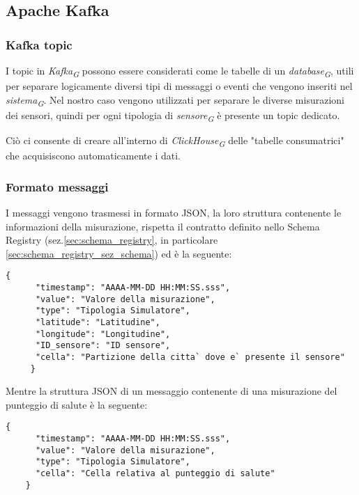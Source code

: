\subsection{Apache Kafka}
\subsubsection{Kafka topic}
I topic in \textit{Kafka}\textsubscript{\textit{G}} possono essere considerati come le tabelle di un \textit{database}\textsubscript{\textit{G}}, utili per separare logicamente diversi tipi di messaggi o eventi che vengono inseriti nel \textit{sistema}\textsubscript{\textit{G}}. Nel nostro caso vengono utilizzati per separare le diverse misurazioni dei sensori, quindi per ogni tipologia di \textit{sensore}\textsubscript{\textit{G}} è presente un topic dedicato.

Ciò ci consente di creare all'interno di \textit{ClickHouse}\textsubscript{\textit{G}} delle "tabelle consumatrici" che acquisiscono automaticamente i dati.

\subsubsection{Formato messaggi} \label{sec:formatoMessaggi}
I messaggi vengono trasmessi in formato JSON, la loro struttura contenente le informazioni della misurazione, rispetta il contratto definito nello Schema Registry (sez.\ref{sec:schema_registry}, in particolare \ref{sec:schema_registry_sez_schema}) ed è la seguente:
\begin{lstlisting}[style=code]
    {
      "timestamp": "AAAA-MM-DD HH:MM:SS.sss", 
      "value": "Valore della misurazione",  
      "type": "Tipologia Simulatore",
      "latitude": "Latitudine",
      "longitude": "Longitudine",
      "ID_sensore": "ID sensore",
      "cella": "Partizione della citta` dove e` presente il sensore" 
     }
\end{lstlisting}

Mentre la struttura JSON di un messaggio contenente di una misurazione del punteggio di salute è la seguente:
\begin{lstlisting}[style=code]
    {
      "timestamp": "AAAA-MM-DD HH:MM:SS.sss", 
      "value": "Valore della misurazione",  
      "type": "Tipologia Simulatore",
      "cella": "Cella relativa al punteggio di salute"
    }
\end{lstlisting}


